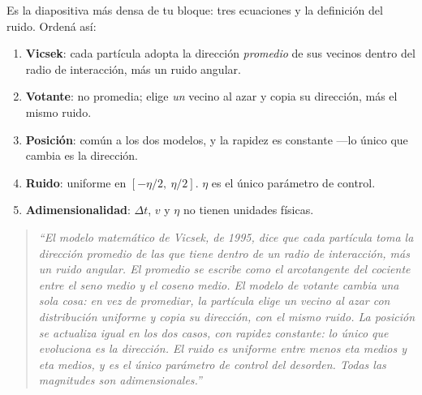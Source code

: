 \documentclass[11pt]{article}
\begin{document}



Es la diapositiva más densa de tu bloque: tres ecuaciones y la definición del
ruido. Ordená así:

\begin{enumerate}
  \item \textbf{Vicsek}: cada partícula adopta la dirección \emph{promedio} de
    sus vecinos dentro del radio de interacción, más un ruido angular.
  \item \textbf{Votante}: no promedia; elige \emph{un} vecino al azar y copia su
    dirección, más el mismo ruido.
  \item \textbf{Posición}: común a los dos modelos, y la rapidez es constante
    ---lo único que cambia es la dirección.
  \item \textbf{Ruido}: uniforme en $[-\eta/2,\ \eta/2]$. $\eta$ es el único
    parámetro de control.
  \item \textbf{Adimensionalidad}: $\Delta t$, $v$ y $\eta$ no tienen unidades
    físicas.
\end{enumerate}

\begin{quote}
\itshape
``El modelo matemático de Vicsek, de 1995, dice que cada partícula toma la
dirección promedio de las que tiene dentro de un radio de interacción, más un
ruido angular. El promedio se escribe como el arcotangente del cociente entre el
seno medio y el coseno medio. El modelo de votante cambia una sola cosa: en vez
de promediar, la partícula elige un vecino al azar con distribución uniforme y
copia su dirección, con el mismo ruido. La posición se actualiza igual en los
dos casos, con rapidez constante: lo único que evoluciona es la dirección. El
ruido es uniforme entre menos eta medios y eta medios, y es el único parámetro
de control del desorden. Todas las magnitudes son adimensionales.''
\end{quote}

\end{document}

